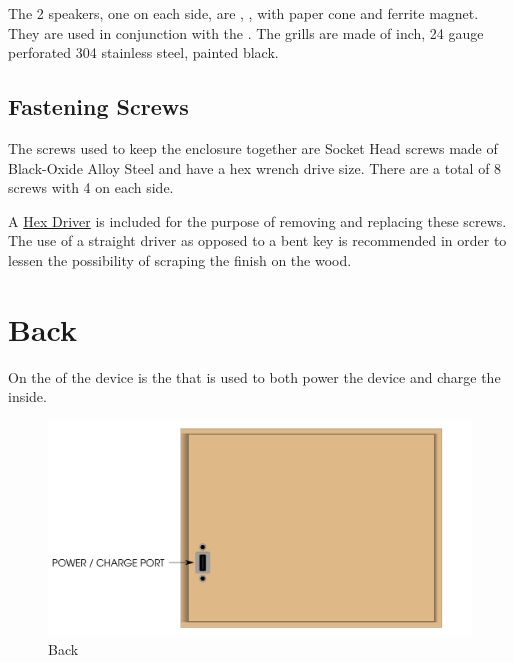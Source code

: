 The \num{2} speakers, one on each side, are \mono{8\thinspace\small{$\Omega$}},
,  with paper cone and ferrite magnet.
They are used in conjunction with the \hyperref[Audio]{}.  The grills are
made of  inch, \num{24} gauge perforated \num{304} stainless steel,
painted black.

\section{Fastening Screws} \label{Fastening Screws}

The screws used to keep the enclosure together are  Socket Head
screws made of Black-Oxide Alloy Steel and have a  hex wrench drive
size.  There are a total of \num{8} screws with \num{4} on each side.


A  \hyperref[Hex Driver]{Hex Driver} is included for the purpose
of removing and replacing these screws.  The use of a straight driver as
opposed to a bent key is recommended in order to lessen the possibility of
scraping the finish on the wood.

\chapter{Back} \label{Back}

On the  of the device is the  that is used to both power the
device and charge the \hyperref[Rechargeable Battery]{} inside.

\begin{figure}[H]
\centering
  \includegraphics{images/back.png}
\caption{Back}
\end{figure}

